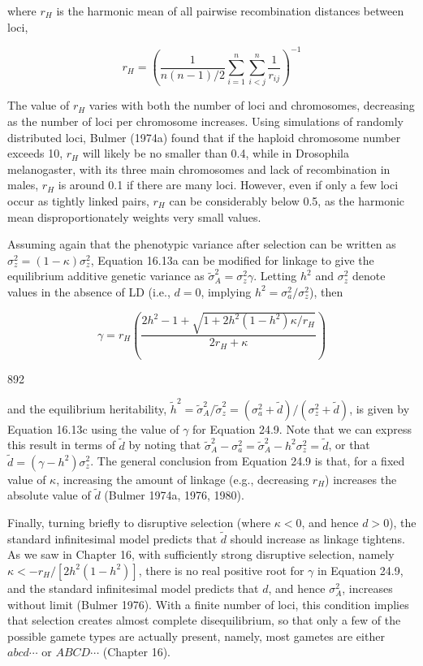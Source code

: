 \documentclass{article}
\begin{document}
where  $ r_{H} $ is the harmonic mean of all pairwise recombination distances between loci,

\begin{equation}
r_{H}=\left(\frac{1}{n\left(n-1\right)/2}\sum_{i=1}^{n}\sum_{i<j}^{n}\frac{1}{r_{ij}}\right)^{-1}
\tag{24.8b}
\label{eq:24_8b}
\end{equation}

The value of  $ r_{H} $ varies with both the number of loci and chromosomes, decreasing as the number of loci per chromosome increases. Using simulations of randomly distributed loci, Bulmer (1974a) found that if the haploid chromosome number exceeds 10,  $ r_{H} $ will likely be no smaller than 0.4, while in Drosophila melanogaster, with its three main chromosomes and lack of recombination in males,  $ r_{H} $ is around 0.1 if there are many loci. However, even if only a few loci occur as tightly linked pairs,  $ r_{H} $ can be considerably below 0.5, as the harmonic mean disproportionately weights very small values.

Assuming again that the phenotypic variance after selection can be written as  $ \sigma_z^2 = (1 - \kappa) \sigma_z^2 $, Equation 16.13a can be modified for linkage to give the equilibrium additive genetic variance as  $ \widetilde{\sigma}_A^2 = \sigma_z^2 \gamma $. Letting  $ h^2 $ and  $ \sigma_z^2 $ denote values in the absence of LD (i.e.,  $ d = 0 $, implying  $ h^2 = \sigma_a^2 / \sigma_z^2 $), then

\begin{equation}
\gamma=r_{H}\left(\frac{2h^{2}-1+\sqrt{1+2h^{2}(1-h^{2})\kappa/r_{H}}}{2r_{H}+\kappa}\right)
\tag{24.9}
\label{eq:24_9}
\end{equation}

892

and the equilibrium heritability,  $ \tilde{h}^2 = \tilde{\sigma}_A^2 / \tilde{\sigma}_z^2 = (\sigma_a^2 + \tilde{d}) / (\sigma_z^2 + \tilde{d}) $, is given by Equation 16.13c using the value of  $ \gamma $ for Equation 24.9. Note that we can express this result in terms of  $ \tilde{d} $ by noting that  $ \tilde{\sigma}_A^2 - \sigma_a^2 = \tilde{\sigma}_A^2 - h^2 \sigma_z^2 = \tilde{d} $, or that  $ \tilde{d} = (\gamma - h^2) \sigma_z^2 $. The general conclusion from Equation 24.9 is that, for a fixed value of  $ \kappa $, increasing the amount of linkage (e.g., decreasing  $ r_H $) increases the absolute value of  $ \tilde{d} $ (Bulmer 1974a, 1976, 1980).

Finally, turning briefly to disruptive selection (where  $ \kappa < 0 $, and hence  $ d > 0 $), the standard infinitesimal model predicts that  $ \widetilde{d} $ should increase as linkage tightens. As we saw in Chapter 16, with sufficiently strong disruptive selection, namely  $ \kappa < -r_H / [2h^2(1 - h^2)] $, there is no real positive root for  $ \gamma $ in Equation 24.9, and the standard infinitesimal model predicts that  $ d $, and hence  $ \sigma_A^2 $, increases without limit (Bulmer 1976). With a finite number of loci, this condition implies that selection creates almost complete disequilibrium, so that only a few of the possible gamete types are actually present, namely, most gametes are either  $ abcd \cdots $ or  $ ABCD \cdots $ (Chapter 16).
\end{document}
